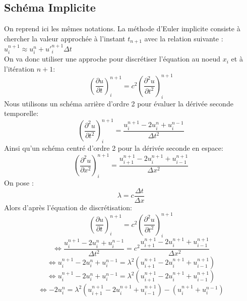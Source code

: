 \subsection{Schéma Implicite}

On reprend ici les mêmes notations. La méthode d'Euler implicite consiste à chercher la valeur approchée à l'instant $t_{n+1}$ avec la relation suivante :
$u^{n+1}_i \approx u^n_i + u'^{n+1}_i\Delta t$\\

On va donc utiliser une approche pour discrétiser l'équation au noeud $x_{i}$ et à l'itération $n+1$:\\
\begin{equation*}
(\frac{\partial u}{\partial t})^{n+1}_{i} = c^2 (\frac{\partial^2u}{\partial t^2})^{n+1}_{i}
\end{equation*}
Nous utilisons un schéma arrière d'ordre 2 pour évaluer la dérivée seconde temporelle:
\begin{equation*}
(\frac{\partial^2u}{\partial t^2})^{n+1}_{i} = \frac{u^{n+1}_{i} - 2u^{n}_{i} + u^{n-1}_{i}}{\Delta t^2}
\end{equation*}
Ainsi qu'un schéma centré d'ordre 2 pour la dérivée seconde en espace:
\begin{equation*}
(\frac{\partial^2u}{\partial x^2})^{n+1}_{i} = \frac{u^{n+1}_{i+1} - 2u^{n+1}_{i} + u^{n+1}_{i-1}}{\Delta x^2}
\end{equation*}
On pose :
\begin{equation*}
\lambda = c \frac{\Delta t}{\Delta x}
\end{equation*}
Alors d'après l'équation de discrétisation:
\begin{equation*}
(\frac{\partial u}{\partial t})^{n+1}_{i} = c^2 (\frac{\partial^2u}{\partial t^2})^{n+1}_{i}
\end{equation*}
\begin{equation*}
\Leftrightarrow\frac{u^{n+1}_{i} - 2u^{n}_{i} + u^{n-1}_{i}}{\Delta t^2} = c^2 \frac{u^{n+1}_{i+1} - 2u^{n+1}_{i} + u^{n+1}_{i-1}}{\Delta x^2}
\end{equation*}
\begin{equation*}
\Leftrightarrow u^{n+1}_{i} - 2u^{n}_{i} + u^{n-1}_{i} = \lambda ^2 (u^{n+1}_{i+1} - 2u^{n+1}_{i} + u^{n+1}_{i-1})
\end{equation*}
\begin{equation*}
\Leftrightarrow u^{n+1}_{i} - 2u^{n}_{i} + u^{n-1}_{i} = \lambda ^2 (u^{n+1}_{i+1} - 2u^{n+1}_{i} + u^{n+1}_{i-1})
\end{equation*}
\begin{equation*}
\Leftrightarrow - 2u^{n}_{i} = \lambda ^2 (u^{n+1}_{i+1} - 2u^{n+1}_{i} + u^{n+1}_{i-1}) - (u^{n+1}_{i} + u^{n-1}_{i})
\end{equation*}

